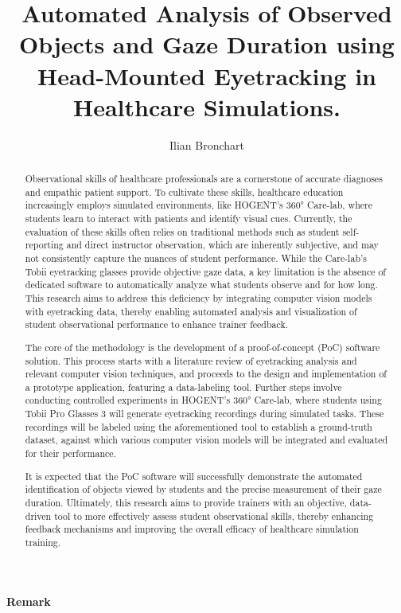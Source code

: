 \documentclass[english]{hogent-article}
\title{Automated Analysis of Observed Objects and Gaze Duration using Head-Mounted Eyetracking in Healthcare Simulations.}
\author{Ilian Bronchart}
\begin{document}
\begin{abstract}
Observational skills of healthcare professionals are a cornerstone of accurate diagnoses and empathic patient support. 
To cultivate these skills, healthcare education increasingly employs simulated environments, 
like HOGENT's 360° Care-lab, where students learn to interact with patients and identify visual cues. 
Currently, the evaluation of these skills often relies on traditional methods such as student 
self-reporting and direct instructor observation, which are inherently subjective, and may not 
consistently capture the nuances of student performance. 
While the Care-lab's Tobii eyetracking glasses provide objective gaze data, a key limitation is the absence 
of dedicated software to automatically analyze what students observe and for how long.
This research aims to address this deficiency by integrating computer vision models with eyetracking data, 
thereby enabling automated analysis and visualization of student observational performance to enhance trainer feedback.

The core of the methodology is the development of a proof-of-concept (PoC) software solution. 
This process starts with a literature review of eyetracking analysis and relevant computer vision techniques, 
and proceeds to the design and implementation of a prototype application, featuring a data-labeling tool. 
Further steps involve conducting controlled experiments in HOGENT's 360° Care-lab, 
where students using Tobii Pro Glasses 3 will generate eyetracking recordings during simulated tasks. 
These recordings will be labeled using the aforementioned tool to establish a ground-truth dataset, 
against which various computer vision models will be integrated and evaluated for their 
performance.

It is expected that the PoC software will successfully demonstrate the automated identification 
of objects viewed by students and the precise measurement of their gaze duration. 
Ultimately, this research aims to provide trainers with an objective, data-driven tool to more effectively assess 
student observational skills, thereby enhancing feedback mechanisms and improving the overall efficacy of healthcare simulation training.
\end{abstract}

\tableofcontents

\bigskip

\paragraph{Remark}
\end{document}
